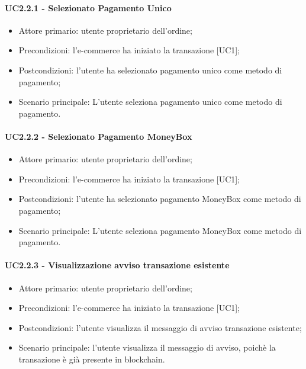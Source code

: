 \paragraph{UC2.2.1 - Selezionato Pagamento Unico}\label{sssec: UC2.2.1}

\begin{itemize}
    \item Attore primario: utente proprietario dell'ordine;
    \item Precondizioni: l'e-commerce\glo{} ha iniziato la transazione [UC1];
    \item Postcondizioni: l'utente ha selezionato pagamento unico come metodo di pagamento;
    \item Scenario principale: L'utente seleziona pagamento unico come metodo di pagamento.
\end{itemize}

\paragraph{UC2.2.2 -  Selezionato Pagamento MoneyBox}

\begin{itemize}
    \item Attore primario: utente proprietario dell'ordine;
    \item Precondizioni: l'e-commerce\glo{} ha iniziato la transazione [UC1];
    \item Postcondizioni: l'utente ha selezionato pagamento MoneyBox\glo{} come metodo di pagamento;
    \item Scenario principale: L'utente seleziona pagamento MoneyBox\glo{} come metodo di pagamento.
\end{itemize}

\paragraph{UC2.2.3 - Visualizzazione avviso transazione esistente}

\begin{itemize}
    \item Attore primario: utente proprietario dell'ordine;
    \item Precondizioni: l'e-commerce\glo{} ha iniziato la transazione [UC1];
    \item Postcondizioni: l'utente visualizza il messaggio di avviso transazione esistente;
    \item Scenario principale: l'utente visualizza il messaggio di avviso, poichè la transazione è già presente in blockchain.
\end{itemize}

